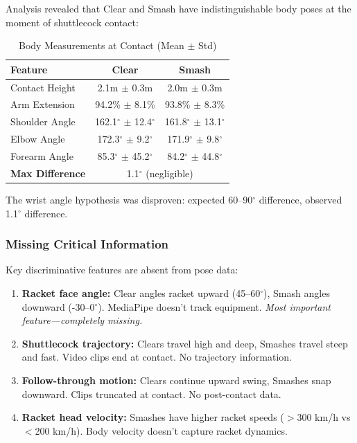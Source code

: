 \documentclass[12pt,a4paper]{article}
\begin{document}
Analysis revealed that Clear and Smash have indistinguishable body poses at the moment of shuttlecock contact:

\begin{table}[H]
\centering
\caption{Body Measurements at Contact (Mean $\pm$ Std)}
\begin{tabular}{lcc}
\toprule
Feature & Clear & Smash \\
\midrule
Contact Height & 2.1m $\pm$ 0.3m & 2.0m $\pm$ 0.3m \\
Arm Extension & 94.2\% $\pm$ 8.1\% & 93.8\% $\pm$ 8.3\% \\
Shoulder Angle & 162.1$^\circ$ $\pm$ 12.4$^\circ$ & 161.8$^\circ$ $\pm$ 13.1$^\circ$ \\
Elbow Angle & 172.3$^\circ$ $\pm$ 9.2$^\circ$ & 171.9$^\circ$ $\pm$ 9.8$^\circ$ \\
Forearm Angle & 85.3$^\circ$ $\pm$ 45.2$^\circ$ & 84.2$^\circ$ $\pm$ 44.8$^\circ$ \\
\midrule
\textbf{Max Difference} & \multicolumn{2}{c}{1.1$^\circ$ (negligible)} \\
\bottomrule
\end{tabular}
\end{table}

The wrist angle hypothesis was disproven: expected 60--90$^\circ$ difference, observed 1.1$^\circ$ difference.

\subsubsection{Missing Critical Information}

Key discriminative features are absent from pose data:

\begin{enumerate}
\item \textbf{Racket face angle:} Clear angles racket upward (45--60$^\circ$), Smash angles downward (-30--0$^\circ$). MediaPipe doesn't track equipment. \textit{Most important feature---completely missing.}

\item \textbf{Shuttlecock trajectory:} Clears travel high and deep, Smashes travel steep and fast. Video clips end at contact. No trajectory information.

\item \textbf{Follow-through motion:} Clears continue upward swing, Smashes snap downward. Clips truncated at contact. No post-contact data.

\item \textbf{Racket head velocity:} Smashes have higher racket speeds ($>$300 km/h vs $<$200 km/h). Body velocity doesn't capture racket dynamics.
\end{enumerate}
\end{document}
